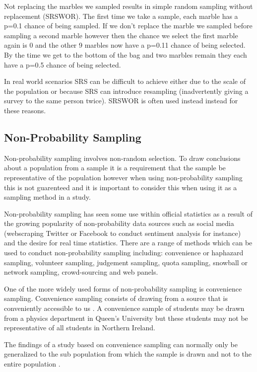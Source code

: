 \documentclass[
]{book}
\begin{document}
Not replacing the marbles we sampled results in simple random sampling without replacement (SRSWOR). The first time we take a sample, each marble has a p=0.1 chance of being sampled. If we don't replace the marble we sampled before sampling a second marble however then the chance we select the first marble again is 0 and the other 9 marbles now have a p=0.11 chance of being selected. By the time we get to the bottom of the bag and two marbles remain they each have a p=0.5 chance of being selected.

In real world scenarios SRS can be difficult to achieve either due to the scale of the population or because SRS can introduce resampling (inadvertently giving a survey to the same person twice). SRSWOR is often used instead instead for these reasons.

\hypertarget{non-probability-sampling}{%
\subsection{Non-Probability Sampling}\label{non-probability-sampling}}

Non-probability sampling involves non-random selection. To draw conclusions about a population from a sample it is a requirement that the sample be representative of the population however when using non-probability sampling this is not guarenteed and it is important to consider this when using it as a sampling method in a study.

Non-probability sampling has seen some use within official statistics as a result of the growing popularity of non-probability data sources such as social media (webscraping Twitter or Facebook to conduct sentiment analysis for instance) and the desire for real time statistics. There are a range of methods which can be used to conduct non-probability sampling including: convenience or haphazard sampling, volunteer sampling, judgement sampling, quota sampling, snowball or network sampling, crowd-sourcing and web panels.

One of the more widely used forms of non-probability sampling is convenience sampling. Convenience sampling consists of drawing from a source that is conveniently accessible to us \citep{andrade}. A convenience sample of students may be drawn from a physics department in Queen's University but these students may not be representative of all students in Northern Ireland.

The findings of a study based on convenience sampling can normally only be generalized to the sub population from which the sample is drawn and not to the entire population \citep{andrade}.
\end{document}
